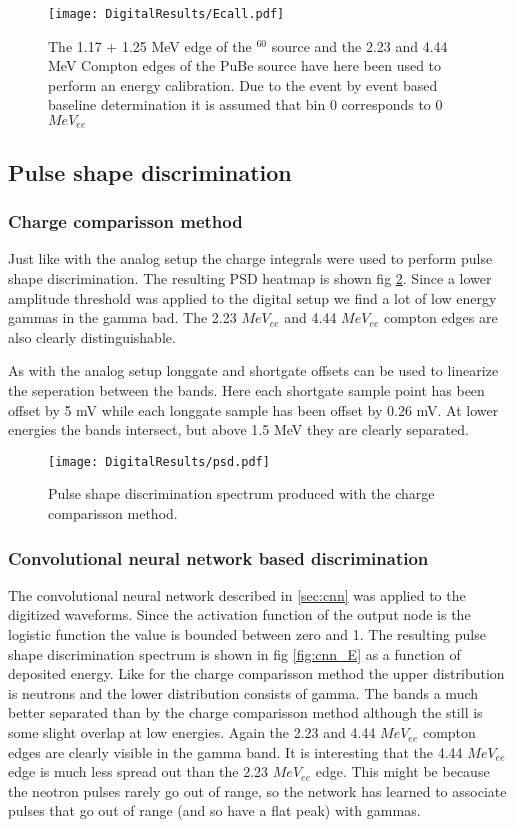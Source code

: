 \documentclass[main.tex]{subfiles}
\begin{document}
\begin{figure}[ht]
    \centering
        \texttt{[image: DigitalResults/Ecall.pdf]}
        \caption{The 1.17 + 1.25 MeV edge of the $^60$ source and the 2.23 and 4.44 MeV Compton edges of the PuBe source have here been used to perform an energy calibration. Due to the event by event based baseline determination it is assumed that bin 0 corresponds to 0 $MeV_{ee}$}
    \label{fig:D_QDC}
\end{figure}


\clearpage
\subsection{Pulse shape discrimination}
\subsubsection{Charge comparisson method}
Just like with the analog setup the charge integrals were used to perform pulse shape discrimination. The resulting PSD heatmap is shown fig \ref{fig:psd_d}. Since a lower amplitude threshold was applied to the digital setup we find a lot of low energy gammas in the gamma bad. The 2.23 $MeV_{ee}$ and 4.44 $MeV_{ee}$ compton edges are also clearly distinguishable. 

As with the analog setup longgate and shortgate offsets can be used to linearize the seperation between the bands. Here each shortgate sample point has been offset by 5 mV while each longgate sample has been offset by 0.26 mV. At lower energies the bands intersect, but above 1.5 MeV they are clearly separated.

\begin{figure}[ht]
    \centering
        \texttt{[image: DigitalResults/psd.pdf]}
        \caption{Pulse shape discrimination spectrum produced with the charge comparisson method.}
        \label{fig:psd_d}
\end{figure}

\subsubsection{Convolutional neural network based discrimination}
The convolutional neural network described in \ref{sec:cnn} was applied to the digitized waveforms. Since the activation function of the output node is the logistic function the value is bounded between zero and 1. The resulting pulse shape discrimination spectrum is shown in fig \ref{fig:cnn_E} as a function of deposited energy. Like for the charge comparisson method the upper distribution is neutrons and the lower distribution consists of gamma. The bands a much better separated than by the charge comparisson method although the still is some slight overlap at low energies. Again the 2.23 and 4.44 $MeV_{ee}$ compton edges are clearly visible in the gamma band. It is interesting that the 4.44 $MeV_{ee}$ edge is much less spread out than the 2.23 $MeV_{ee}$ edge. This might be because the neotron pulses rarely go out of range, so the network has learned to associate pulses that go out of range (and so have a flat peak) with gammas.
\end{document}
